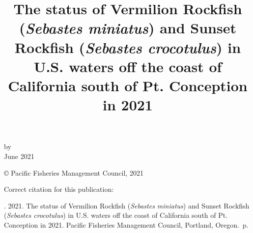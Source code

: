 \documentclass[11pt,
  english,
  a4paper,
]{article}
\date{}
\newcommand{\trTitle}{The status of Vermilion Rockfish (\emph{Sebastes miniatus}) and Sunset Rockfish (\emph{Sebastes crocotulus}) in U.S. waters off the coast of California south of Pt. Conception in 2021}
\newcommand{\trYear}{2021}
\newcommand{\trMonth}{June}
\newcommand{\trAuthsBack}{}
\newcommand{\trCitation}{
\begin{hangparas}{1em}{1}
\trAuthsBack{}. \trYear{}. \trTitle{}. Pacific Fisheries Management Council, Portland, Oregon. \pageref{LastPage}{}\,p.
\end{hangparas}}
\begin{document}

\renewcommand*{\thefootnote}{\fnsymbol{footnote}}

\small
\thispagestyle{empty}
\noindent
\begin{center}
\title{The status of Vermilion Rockfish (\emph{Sebastes miniatus}) and Sunset Rockfish (\emph{Sebastes crocotulus}) in U.S. waters off the coast of California south of Pt. Conception in 2021}
\vspace{1.5cm}
{\Large\textbf{}}
\vfill
by\\
\vfill
\vfill
\trMonth{} \trYear{}
\end{center}
\clearpage

\thispagestyle{empty}
\vspace*{\fill}
\begin{center}
\copyright{} Pacific Fisheries Management Council, \trYear{}\\
\end{center}
\par
\bigskip
\noindent
Correct citation for this publication:
\bigskip
\par
\trCitation{}
\clearpage


\tableofcontents\clearpage
\label{TRlastRoman}
\clearpage

\newpage
\thispagestyle{empty} %

\pagestyle{plain}  %
\renewcommand*{\thefootnote}{\arabic{footnote}}  %
\setcounter{footnote}{0}  %
\renewcommand{\headrulewidth}{0.5pt}
\renewcommand{\footrulewidth}{0.5pt}

\newcommand{\lt}{\ensuremath <}
\newcommand{\gt}{\ensuremath >}

\pagebreak
{}
\setcounter{page}{1}
\end{document}
